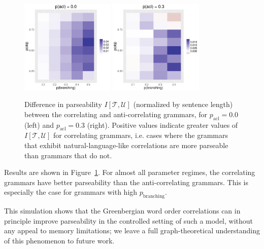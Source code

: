 \documentclass[10pt,twoside,lineno]{article}
\begin{document}
\begin{figure}
	\begin{center}	
\includegraphics[width=0.4\textwidth]{../models/revision/toy_simulations/result_NPBranching0_0.pdf}
\includegraphics[width=0.4\textwidth]{../models/revision/toy_simulations/result_NPBranching0_3.pdf}
\end{center}

	\caption{Difference in parseability $I[\mathcal{T}, \mathcal{U}]$ (normalized by sentence length) between the correlating and anti-correlating grammars, for $p_\text{acl} = 0.0$ (left) and $p_\text{acl} = 0.3$ (right). Positive values indicate greater values of $I[\mathcal{T}, \mathcal{U}]$ for correlating grammars, i.e. cases where the grammars that exhibit natural-language-like correlations are more parseable than grammars that do not.}\label{fig:toy-parseability}
\end{figure}


Results are shown in Figure~\ref{fig:toy-parseability}. For almost all parameter regimes, the correlating grammars have better parseability than the anti-correlating grammars. This is especially the case for grammars with high $p_\text{branching}$. 

This simulation shows that the Greenbergian word order correlations can in principle improve parseability in the controlled setting of such a model, without any appeal to memory limitations; we leave a full graph-theoretical understanding of this phenomenon to future work.


\nocite{diessel2001ordering, dryer1980positional, wals} 




\end{document}
